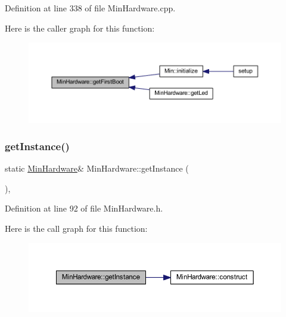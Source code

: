 Definition at line 338 of file Min\+Hardware.\+cpp.

Here is the caller graph for this function\+:
\nopagebreak
\begin{figure}[H]
\begin{center}
\leavevmode
\includegraphics[width=350pt]{class_min_hardware_a8227e23999bf74110a124c889c80759e_icgraph}
\end{center}
\end{figure}
\mbox{\label{class_min_hardware_a47f2709e0cba6ed3b9d35fdd8baf8765}} 
\subsubsection{\texorpdfstring{get\+Instance()}{getInstance()}}
{\footnotesize\ttfamily static \hyperlink{class_min_hardware}{Min\+Hardware}\& Min\+Hardware\+::get\+Instance (\begin{DoxyParamCaption}{ }\end{DoxyParamCaption})\hspace{0.3cm}{\ttfamily [inline]}, {\ttfamily [static]}}



Definition at line 92 of file Min\+Hardware.\+h.

Here is the call graph for this function\+:
\nopagebreak
\begin{figure}[H]
\begin{center}
\leavevmode
\includegraphics[width=350pt]{class_min_hardware_a47f2709e0cba6ed3b9d35fdd8baf8765_cgraph}
\end{center}
\end{figure}
\mbox{\label{class_min_hardware_a1401ae874f57cc5ce31032c8eea57fbd}} 
